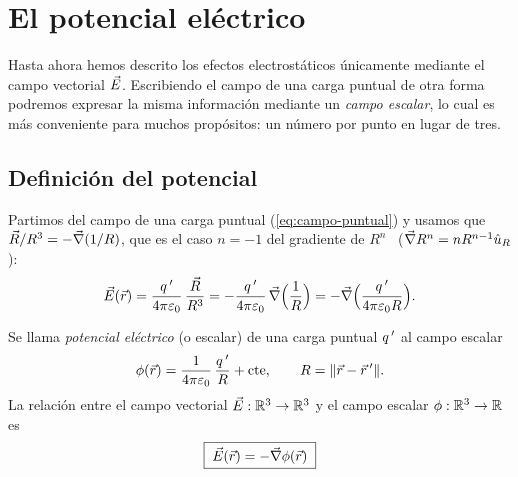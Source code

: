 \section{El potencial eléctrico}\label{sec:potencial}
Hasta ahora hemos descrito los efectos electrostáticos únicamente mediante el campo vectorial $\vec{E}$. Escribiendo el campo de una
carga puntual de otra forma podremos expresar la misma información mediante un \emph{campo escalar}, lo cual es más
conveniente para muchos propósitos: un número por punto en lugar de tres.

\subsection{Definición del potencial}\label{sec:def-potencial}
Partimos del campo de una carga puntual (\cref{eq:campo-puntual}) y usamos que $\vec{R}/R^{3}=-\vec{\nabla}(1/R)$, que es el caso $n=-1$ del
gradiente de $R^{n}$~\cite{TEMA0} ($\vec{\nabla} R^{n}=nR^{n-1}\hat{u}_{R}$):
\begin{equation}\label{eq:campo-grad}
  \vec{E}(\vec{r})=\frac{q\,'}{4\pi\varepsilon_{0}}\,\frac{\vec{R}}{R^{3}}=-\frac{q\,'}{4\pi\varepsilon_{0}}\,\vec{\nabla}\Bigl(\frac{1}{R}\Bigr)
  =-\vec{\nabla}\Bigl(\frac{q\,'}{4\pi\varepsilon_{0} R}\Bigr).
\end{equation}

\begin{definicion}\label{def:potencial}
Se llama \emph{potencial eléctrico} (o escalar) de una carga puntual $q\,'$ al campo escalar
\begin{equation}\label{eq:potencial-puntual}
  \phi(\vec{r})=\frac{1}{4\pi\varepsilon_{0}}\,\frac{q\,'}{R}+\text{cte},\qquad R=\lVert \vec{r}-\vec{r}\,'\rVert.
\end{equation}
La relación entre el campo vectorial $\vec{E}:\mathbb{R}^{3}\to\mathbb{R}^{3}$ y el campo escalar $\phi:\mathbb{R}^{3}\to\mathbb{R}$ es
\begin{equation}\label{eq:E-grad-phi}
  \boxed{\;\vec{E}(\vec{r})=-\vec{\nabla}\phi(\vec{r})\;}
\end{equation}
\end{definicion}

